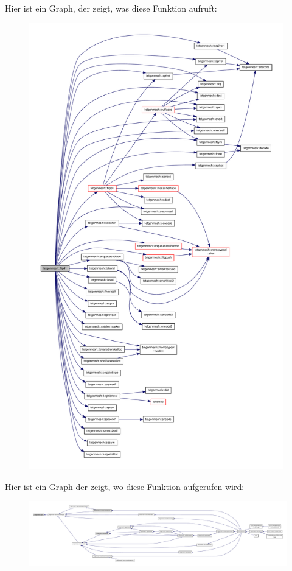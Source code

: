 Hier ist ein Graph, der zeigt, was diese Funktion aufruft\-:
\nopagebreak
\begin{figure}[H]
\begin{center}
\leavevmode
\includegraphics[height=550pt]{classtetgenmesh_a061a1d2f047d12726215eac51c7bb5a1_cgraph}
\end{center}
\end{figure}




Hier ist ein Graph der zeigt, wo diese Funktion aufgerufen wird\-:
\nopagebreak
\begin{figure}[H]
\begin{center}
\leavevmode
\includegraphics[width=350pt]{classtetgenmesh_a061a1d2f047d12726215eac51c7bb5a1_icgraph}
\end{center}
\end{figure}



